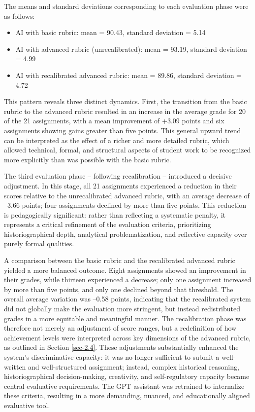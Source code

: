 \documentclass[english]{textolivre}
\begin{document}
The means and standard deviations corresponding to each evaluation phase were as follows:

\begin{itemize}
    \item AI with basic rubric: mean = 90.43, standard deviation = 5.14
    \item AI with advanced rubric (unrecalibrated): mean = 93.19, standard deviation = 4.99
    \item AI with recalibrated advanced rubric: mean = 89.86, standard deviation = 4.72
\end{itemize}

This pattern reveals three distinct dynamics. First, the transition from the basic rubric to the advanced rubric resulted in an increase in the average grade for 20 of the 21 assignments, with a mean improvement of +3.09 points and six assignments showing gains greater than five points. This general upward trend can be interpreted as the effect of a richer and more detailed rubric, which allowed technical, formal, and structural aspects of student work to be recognized more explicitly than was possible with the basic rubric.

The third evaluation phase -- following recalibration -- introduced a decisive adjustment. In this stage, all 21 assignments experienced a reduction in their scores relative to the unrecalibrated advanced rubric, with an average decrease of –3.66 points; four assignments declined by more than five points. This reduction is pedagogically significant: rather than reflecting a systematic penalty, it represents a critical refinement of the evaluation criteria, prioritizing historiographical depth, analytical problematization, and reflective capacity over purely formal qualities.

A comparison between the basic rubric and the recalibrated advanced rubric yielded a more balanced outcome. Eight assignments showed an improvement in their grades, while thirteen experienced a decrease; only one assignment increased by more than five points, and only one declined beyond that threshold. The overall average variation was –0.58 points, indicating that the recalibrated system did not globally make the evaluation more stringent, but instead redistributed grades in a more equitable and meaningful manner. The recalibration phase was therefore not merely an adjustment of score ranges, but a redefinition of how achievement levels were interpreted across key dimensions of the advanced rubric, as outlined in Section \ref{sec-2.4}. These adjustments substantially enhanced the system’s discriminative capacity: it was no longer sufficient to submit a well-written and well-structured assignment; instead, complex historical reasoning, historiographical decision-making, creativity, and self-regulatory capacity became central evaluative requirements. The GPT assistant was retrained to internalize these criteria, resulting in a more demanding, nuanced, and educationally aligned evaluative tool.
\end{document}
